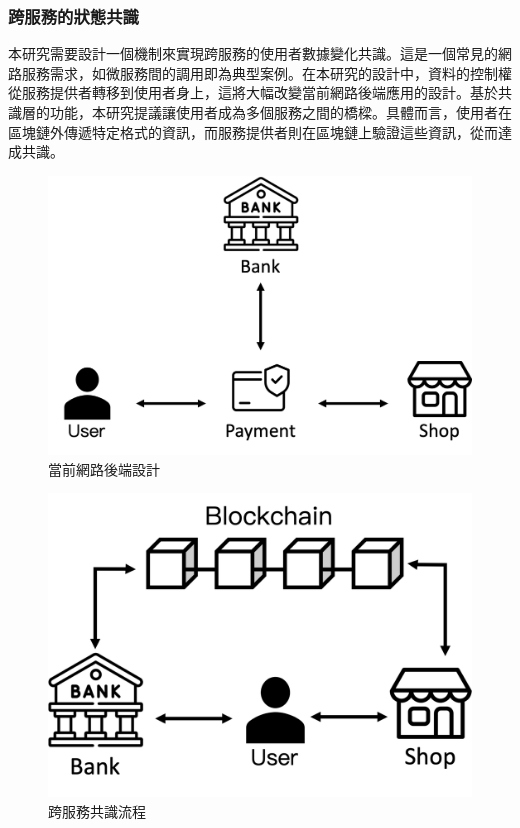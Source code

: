 \subsubsection{跨服務的狀態共識}
本研究需要設計一個機制來實現跨服務的使用者數據變化共識。這是一個常見的網路服務需求，如微服務間的調用即為典型案例。在本研究的設計中，資料的控制權從服務提供者轉移到使用者身上，這將大幅改變當前網路後端應用的設計。基於共識層的功能，本研究提議讓使用者成為多個服務之間的橋樑。具體而言，使用者在區塊鏈外傳遞特定格式的資訊，而服務提供者則在區塊鏈上驗證這些資訊，從而達成共識。
\begin{figure}
  \centering
  \includegraphics[width=\linewidth,keepaspectratio]{figures/flow-3-part-0.png}
  \caption{當前網路後端設計}
  \label{fig:flow-3-part-0}
\end{figure}
\begin{figure}
  \centering
  \includegraphics[width=\linewidth,keepaspectratio]{figures/flow-3-part.png}
  \caption{跨服務共識流程}
  \label{fig:flow-3-part}
\end{figure}
